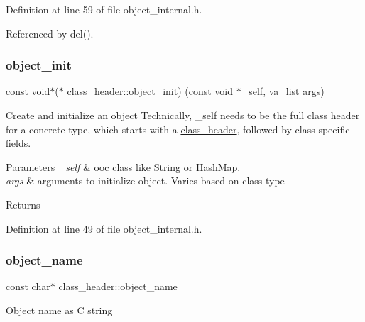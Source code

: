 Definition at line 59 of file object\+\_\+internal.\+h.



Referenced by del().

\mbox{\label{structclass__header_a560f3c418eb904136bfcb91d3618430c}} 
\subsubsection{\texorpdfstring{object\+\_\+init}{object\_init}}
{\footnotesize\ttfamily const void$\ast$($\ast$ class\+\_\+header\+::object\+\_\+init) (const void $\ast$\+\_\+self, va\+\_\+list args)}

Create and initialize an object Technically, \+\_\+self needs to be the full class header for a concrete type, which starts with a \mbox{\hyperlink{structclass__header}{class\+\_\+header}}, followed by class specific fields.


\begin{DoxyParams}{Parameters}
{\em \+\_\+self} & ooc class like \mbox{\hyperlink{structString}{String}} or \mbox{\hyperlink{structHashMap}{Hash\+Map}}. \\
\hline
{\em args} & arguments to initialize object. Varies based on class type \\
\hline
\end{DoxyParams}
\begin{DoxyReturn}{Returns}

\end{DoxyReturn}


Definition at line 49 of file object\+\_\+internal.\+h.

\mbox{\label{structclass__header_af7f2f5623c98afb59519062172644350}} 
\subsubsection{\texorpdfstring{object\+\_\+name}{object\_name}}
{\footnotesize\ttfamily const char$\ast$ class\+\_\+header\+::object\+\_\+name}

Object name as C string 

